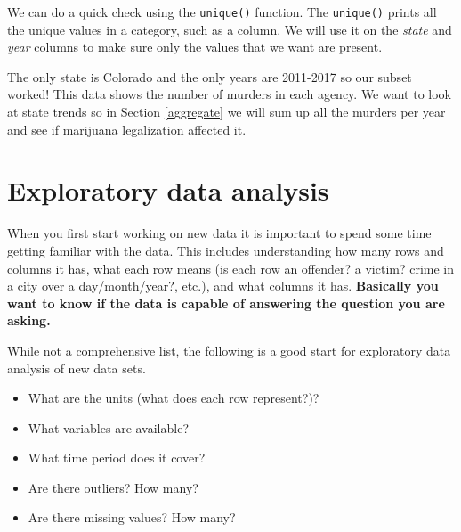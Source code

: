 \documentclass[
  12pt,
]{book}
\newenvironment{Shaded}{\begin{snugshade}}{\end{snugshade}}
\newcommand{\CommentTok}[1]{\textcolor[rgb]{0.37,0.37,0.37}{\textit{#1}}}
\newcommand{\FunctionTok}[1]{\textcolor[rgb]{0,0,0}{#1}}
\newcommand{\NormalTok}[1]{#1}
\newcommand{\SpecialCharTok}[1]{\textcolor[rgb]{0,0,0}{#1}}
\providecommand{\tightlist}{%
  \setlength{\itemsep}{0pt}\setlength{\parskip}{0pt}}
\begin{document}
We can do a quick check using the \texttt{unique()} function. The \texttt{unique()} prints all the unique values in a category, such as a column. We will use it on the \emph{state} and \emph{year} columns to make sure only the values that we want are present.

\begin{Shaded}
\end{Shaded}

\begin{Shaded}
\end{Shaded}

The only state is Colorado and the only years are 2011-2017 so our subset worked! This data shows the number of murders in each agency. We want to look at state trends so in Section \ref{aggregate} we will sum up all the murders per year and see if marijuana legalization affected it.

\hypertarget{explore}{%
\chapter{Exploratory data analysis}\label{explore}}

When you first start working on new data it is important to spend some time getting familiar with the data. This includes understanding how many rows and columns it has, what each row means (is each row an offender? a victim? crime in a city over a day/month/year?, etc.), and what columns it has. \textbf{Basically you want to know if the data is capable of answering the question you are asking.}

While not a comprehensive list, the following is a good start for exploratory data analysis of new data sets.

\begin{itemize}
\tightlist
\item
  What are the units (what does each row represent?)?
\item
  What variables are available?
\item
  What time period does it cover?
\item
  Are there outliers? How many?
\item
  Are there missing values? How many?
\end{itemize}
\end{document}

